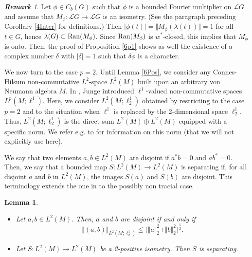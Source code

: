 \documentclass[12pt]{amsart}
\newcommand{\norm}[1]{\Vert#1\Vert}
\newcommand{\bignorm}[1]{\bigl\Vert#1\bigr\Vert}
\newtheorem{lemma}[theorem]{Lemma}
\theoremstyle{remark}
\newtheorem{remark}[theorem]{\bf Remark}
\theoremstyle{definition}
\numberwithin{equation}{section}
\begin{document}
\begin{remark}\label{6-Infty}
Let $\phi\in C_b(G)$ such that $\phi$
is a bounded Fourier multiplier on 
${\mathcal L}G$ and assume that $M_\phi\colon
{\mathcal L}G\to {\mathcal L}G$ is an isometry.
(See the paragraph preceding Corollary \ref{4Inter}
for definitions.) Then $\vert\phi(t)\vert = \norm{M_\phi(\lambda(t))}=1$
for all $t\in G$, hence $\lambda(G)\subset {\rm Ran}(M_\phi)$. Since ${\rm Ran}(M_\phi)$ is
$w^*$-closed, this implies that $M_\phi$ is onto. 
Then, the proof of Proposition \ref{6p1} shows as well
the existence of a complex number $\delta$
with $\vert\delta\vert =1$ such that $\delta\phi$ is a character. 
\end{remark}

We now turn to the case $p=2$.
Until Lemma \ref{6Pos}, we  consider any Connes-Hilsum
non-commutative $L^2$-space $L^2(M)$ built upon
an arbitrary von Neumann algebra $M$. In
\cite{Ju}, Junge introduced $\ell^1$-valued 
non-commutative spaces $L^p(M;\ell^1)$. Here, we consider
$L^2(M; \ell^1_2)$ obtained by restricting to the case 
$p=2$ and to the situation when $\ell^1$ is replaced by the 
2-dimensional space $\ell^1_2$. Thus, $L^2(M; \ell^1_2)$ is the
direct sum
$L^2(M)\oplus L^2(M)$ equipped with 
a specific norm. We refer e.g. to \cite{LMZ} for information on this norm
(that we will not explicitly use here).


We say that two
elements $a,b\in L^2(M)$ are disjoint if $a^*b=0$ and $ab^*=0$.
Then, we say that a bounded map $S\colon L^2(M)\to L^2(M)$ is separating 
if, for all disjoint $a$ and $b$ in $L^2(M)$, 
the images $S(a)$ and $S(b)$ are disjoint.
This terminology extends the one in  \cite[Section 3]{LMZ}
to the possibly non tracial case.


\begin{lemma}\label{6LMZ}
\begin{itemize} 
\item [(1)] Let $a,b\in L^2(M)$. Then, $a$ and $b$ are disjoint if and only if 
$$
\bignorm{(a,b)}_{L^2(M; \ell^1_2)}\leq \bigl(\norm{a}_2^2 +\norm{b}_2^2\bigr)^\frac12.
$$
\item [(2)] Let $S\colon L^2(M)\to L^2(M)$ be a 2-positive isometry. Then $S$ is separating.
\end{itemize}
\end{lemma}
\end{document}
